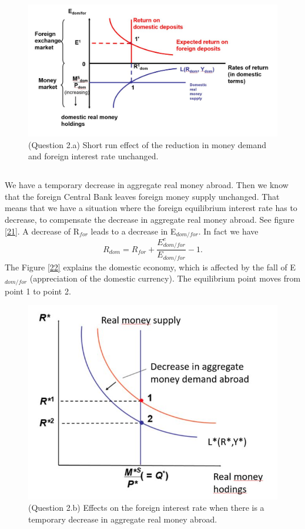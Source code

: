 \documentclass[	11pt, ]{fphw}
\begin{document}
\begin{figure}[h] 
\centering 
\includegraphics[scale=0.75]{11.JPG} 
\caption{(Question 2.a) Short run effect of the reduction in money demand and foreign interest rate unchanged.} 
\label{11}
\end{figure}

\subsection{}
We have a temporary decrease in aggregate real money abroad. Then we know that the foreign Central Bank leaves foreign money supply unchanged. That means that we have a situation where the foreign equilibrium interest rate has to decrease, to compensate the decrease in aggregate real money abroad. See figure \vref{21}. A decrease of R$_{for}$ leads to a decrease in E$_{dom/for}$. In fact we have
\[ R_{dom}= R_{for} + \frac{E_{dom/for}^{e}}{E_{dom/for}} -1. \]
The Figure \vref{22} explains the domestic economy, which is affected by the fall of E$_{dom/for}$ (appreciation of the domestic currency). The equilibrium point moves from point 1 to point 2. 


\begin{figure}[h!] 
\centering 
\includegraphics[scale=0.7]{21.JPG} 
\caption{(Question 2.b) Effects on the foreign interest rate when there is a temporary decrease in aggregate real money abroad. } 
\label{21}
\end{figure}
\end{document}
